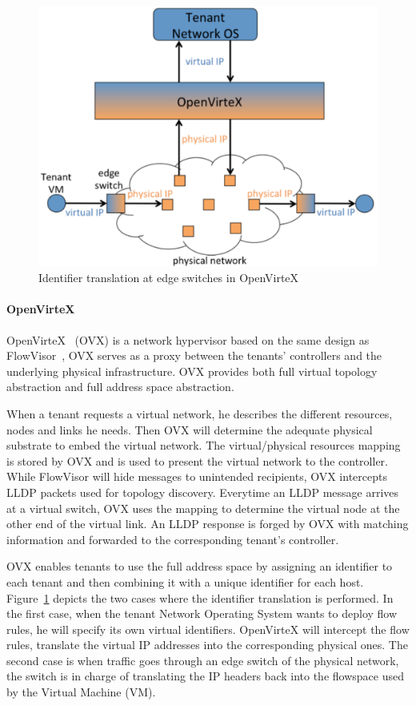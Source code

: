 \begin{figure}[ht]
    \centering
    \includegraphics[scale=0.7]{figures/openvirtex.pdf}
    \caption{Identifier translation at edge switches in OpenVirteX~\cite{OpenVirteX-Al-Shabibi2014}}
    \label{fig:openvirtex}
\end{figure}

\paragraph{OpenVirteX}
OpenVirteX~\cite{OpenVirteX-Al-Shabibi2014} (OVX) is a network hypervisor based on the same design as FlowVisor~\cite{FlowVisor-Sherwood2009}, \ie OVX serves as a proxy between the tenants' controllers and the underlying physical infrastructure. OVX provides both full virtual topology abstraction and full address space abstraction. 

When a tenant requests a virtual network, he describes the different resources, nodes and links he needs.
Then OVX will determine the adequate physical substrate to embed the virtual network.
The virtual/physical resources mapping is stored by OVX and is used to present the virtual network to the controller.
While FlowVisor will hide messages to unintended recipients, OVX intercepts LLDP packets used for topology discovery. Everytime an LLDP message arrives at a virtual switch, OVX uses the mapping to determine the virtual node at the other end of the virtual link. An LLDP response is forged by OVX with matching information and forwarded to the corresponding tenant's controller.

OVX enables tenants to use the full address space by assigning an identifier to each tenant and then combining it with a unique identifier for each host. Figure~\ref{fig:openvirtex} depicts the two cases where the identifier translation is performed. In the first case, when the tenant Network Operating System wants to deploy flow rules, he will specify its own virtual identifiers. OpenVirteX will intercept the flow rules, translate the virtual IP addresses into the corresponding physical ones. The second case is when traffic goes through an edge switch of the physical network, the switch is in charge of translating the IP headers back into the flowspace used by the Virtual Machine (VM).

